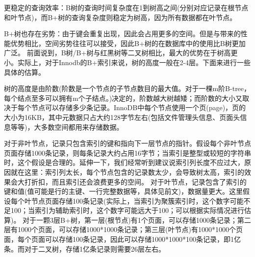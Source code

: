 \documentclass[../../../interview-questions.tex]{subfiles}
\begin{document}
更稳定的查询效率：B树的查询时间复杂度在1到树高之间(分别对应记录在根节点和叶节点)，而B+树的查询复杂度则稳定为树高，因为所有数据都在叶节点。

B+树也存在劣势：由于键会重复出现，因此会占用更多的空间。但是与带来的性能优势相比，空间劣势往往可以接受，因此B+树的在数据库中的使用比B树更加广泛。
前面说到，B树/B+树与红黑树等二叉树相比，最大的优势在于树高更小。实际上，对于Innodb的B+索引来说，树的高度一般在2-4层。下面来进行一些具体的估算。

树的高度是由阶数(阶数是一个节点的子节点数目的最大值。对于一棵m阶B-tree，每个结点至多可以拥有m个子结点。)决定的，阶数越大树越矮；而阶数的大小又取决于每个节点可以存储多少条记录。InnoDB中每个节点使用一个页(page)，页的大小为16KB，其中元数据只占大约128字节左右(包括文件管理头信息、页面头信息等等)，大多数空间都用来存储数据。

对于非叶节点，记录只包含索引的键和指向下一层节点的指针。假设每个非叶节点页面存储1000条记录，则每条记录大约占用16字节；当索引是整型或较短的字符串时，这个假设是合理的。延伸一下，我们经常听到建议说索引列长度不应过大，原因就在这里：索引列太长，每个节点包含的记录数太少，会导致树太高，索引的效果会大打折扣，而且索引还会浪费更多的空间。
对于叶节点，记录包含了索引的键和值(值可能是行的主键、一行完整数据等，具体见前文)，数据量更大。这里假设每个叶节点页面存储100条记录(实际上，当索引为聚簇索引时，这个数字可能不足100；当索引为辅助索引时，这个数字可能远大于100；可以根据实际情况进行估算)。
对于一颗3层B+树，第一层(根节点)有1个页面，可以存储1000条记录；第二层有1000个页面，可以存储1000*1000条记录；第三层(叶节点)有1000*1000个页面，每个页面可以存储100条记录，因此可以存储1000*1000*100条记录，即1亿条。而对于二叉树，存储1亿条记录则需要26层左右。
\end{document}
